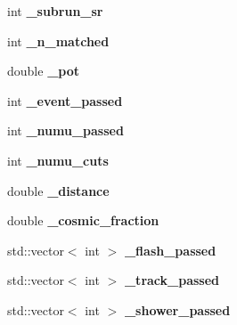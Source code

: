 \begin{DoxyCompactItemize}
\item 
\hypertarget{group__lee_gaba4424e8079da9de241fdd61d648a7f5}{int {\bfseries \-\_\-subrun\-\_\-sr}}\label{group__lee_gaba4424e8079da9de241fdd61d648a7f5}

\item 
\hypertarget{group__lee_ga49bf84147aebe0125c041e58ad39ea63}{int {\bfseries \-\_\-n\-\_\-matched}}\label{group__lee_ga49bf84147aebe0125c041e58ad39ea63}

\item 
\hypertarget{group__lee_gab9e2d69bbb1796181bfb0b73b3571327}{double {\bfseries \-\_\-pot}}\label{group__lee_gab9e2d69bbb1796181bfb0b73b3571327}

\item 
\hypertarget{group__lee_gae2220a696ef93026eca209bb981ffbdd}{int {\bfseries \-\_\-event\-\_\-passed}}\label{group__lee_gae2220a696ef93026eca209bb981ffbdd}

\item 
\hypertarget{group__lee_ga5358fd908f314be50f85ea97523fbca4}{int {\bfseries \-\_\-numu\-\_\-passed}}\label{group__lee_ga5358fd908f314be50f85ea97523fbca4}

\item 
\hypertarget{group__lee_ga50ca292dbf6464fa2845f4aed51f79b7}{int {\bfseries \-\_\-numu\-\_\-cuts}}\label{group__lee_ga50ca292dbf6464fa2845f4aed51f79b7}

\item 
\hypertarget{group__lee_ga67ddd5bec66667568bc59b0dfa13839a}{double {\bfseries \-\_\-distance}}\label{group__lee_ga67ddd5bec66667568bc59b0dfa13839a}

\item 
\hypertarget{group__lee_ga9d3deef73e6dd40b958cb4709ddea35c}{double {\bfseries \-\_\-cosmic\-\_\-fraction}}\label{group__lee_ga9d3deef73e6dd40b958cb4709ddea35c}

\item 
\hypertarget{group__lee_ga39d4c9760193a606cfdeb7af7195486c}{std\-::vector$<$ int $>$ {\bfseries \-\_\-flash\-\_\-passed}}\label{group__lee_ga39d4c9760193a606cfdeb7af7195486c}

\item 
\hypertarget{group__lee_ga222f64bba75838505ac948638260ed6b}{std\-::vector$<$ int $>$ {\bfseries \-\_\-track\-\_\-passed}}\label{group__lee_ga222f64bba75838505ac948638260ed6b}

\item 
\hypertarget{group__lee_ga677892512d8f61dd3783e04b2522925f}{std\-::vector$<$ int $>$ {\bfseries \-\_\-shower\-\_\-passed}}\label{group__lee_ga677892512d8f61dd3783e04b2522925f}


\end{DoxyCompactItemize}
